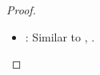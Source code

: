 \begin{proof}
\begin{itemize}[leftmargin=.5in]
  \item{}:  Similar to , .




\end{itemize}
\end{proof}

